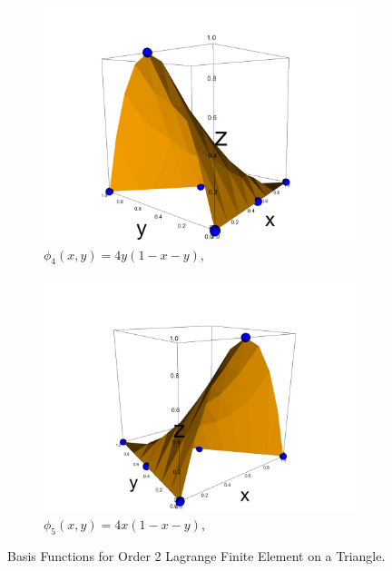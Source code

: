 \documentclass[12pt]{ociamthesis}
\begin{document}
\begin{figure}[H]
\begin{subfigure}{0.5\textwidth}
     \includegraphics[width=\textwidth]{Pics/BasisFunc/triBasis4.png}
     \caption{$\phi_4(x,y) = 4y(1-x-y)$,}
 \end{subfigure}
 \hfill
 \begin{subfigure}{0.5\textwidth}
     \includegraphics[width=\textwidth]{Pics/BasisFunc/triBasis5.png}
     \caption{$\phi_5(x,y) = 4x(1-x-y)$,}
 \end{subfigure}
 \hfill
 \caption{Basis Functions for Order 2 Lagrange Finite Element on a Triangle.} \label{triBasisFuncs}
\end{figure}
\end{document}
